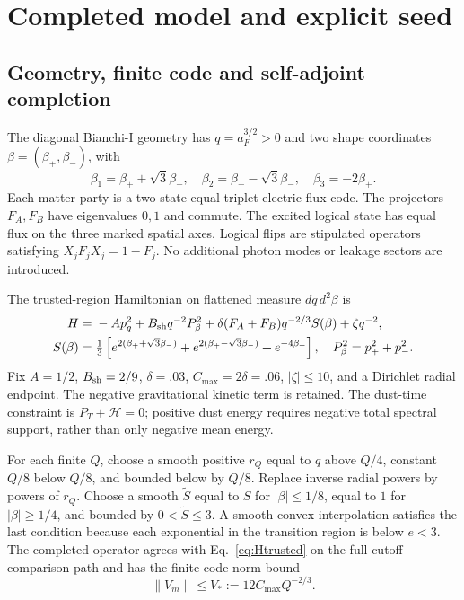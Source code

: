 \documentclass[11pt]{article}
\newcommand{\Hil}{\mathcal H}
\newcommand{\norm}[1]{\left\lVert#1\right\rVert}
\begin{document}
\section{Completed model and explicit seed}\label{sec:model}

\subsection{Geometry, finite code and self-adjoint completion}

The diagonal Bianchi-I geometry has $q=a_F^{3/2}>0$ and two shape coordinates $\beta=(\beta_+,\beta_-)$, with
\[
 \beta_1=\beta_++\sqrt3\beta_-,\quad
 \beta_2=\beta_+-\sqrt3\beta_-,\quad\beta_3=-2\beta_+.
\]
Each matter party is a two-state equal-triplet electric-flux code.
The projectors $F_A,F_B$ have eigenvalues $0,1$ and commute.
The excited logical state has equal flux on the three marked spatial axes.
Logical flips are stipulated operators satisfying $X_jF_jX_j=1-F_j$.
No additional photon modes or leakage sectors are introduced.

The trusted-region Hamiltonian on flattened measure $dq\,d^2\beta$ is
\begin{align}
 H={}&-Ap_q^2+B_{\rm sh}q^{-2}P_\beta^2
 +\delta(F_A+F_B)q^{-2/3}S(\beta)+\zeta q^{-2},\label{eq:Htrusted}\\
 S(\beta)={}&\tfrac13\left[e^{2(\beta_++\sqrt3\beta_-)}
 +e^{2(\beta_+-\sqrt3\beta_-)}+e^{-4\beta_+}\right],\quad
 P_\beta^2=p_+^2+p_-^2.\label{eq:shape}
\end{align}
Fix $A=1/2$, $B_{\rm sh}=2/9$, $\delta=.03$, $C_{\max}=2\delta=.06$, $|\zeta|\le10$, and a Dirichlet radial endpoint.
The negative gravitational kinetic term is retained.
The dust-time constraint is $P_T+\Hil=0$; positive dust energy requires negative total spectral support, rather than only negative mean energy.

For each finite $Q$, choose a smooth positive $r_Q$ equal to $q$ above $Q/4$, constant $Q/8$ below $Q/8$, and bounded below by $Q/8$.
Replace inverse radial powers by powers of $r_Q$.
Choose a smooth $\widetilde S$ equal to $S$ for $|\beta|\le1/8$, equal to $1$ for $|\beta|\ge1/4$, and bounded by $0<\widetilde S\le3$.
A smooth convex interpolation satisfies the last condition because each exponential in the transition region is below $e<3$.
The completed operator agrees with Eq.~\eqref{eq:Htrusted} on the full cutoff comparison path and has the finite-code norm bound
\begin{equation}
 \norm{V_m}\le V_*:=12C_{\max}Q^{-2/3}.\label{eq:Vstar}
\end{equation}
\end{document}
